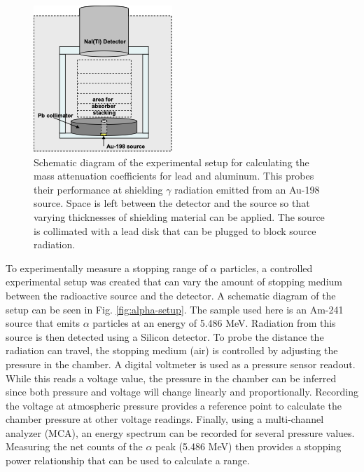 \begin{figure}
\centering
\includegraphics[scale=0.5]{gamma_setup.png}
\caption{Schematic diagram of the experimental setup for calculating the mass attenuation coefficients for lead and aluminum. This probes their performance at shielding $\gamma$ radiation emitted from an Au-198 source. Space is left between the detector and the source so that varying thicknesses of shielding material can be applied. The source is collimated with a lead disk that can be plugged to block source radiation.}
\label{fig:gamma-setup}
\end{figure}

To experimentally measure a stopping range of $\alpha$ particles, a controlled experimental setup was created that can vary the amount of stopping medium between the radioactive source and the detector. A schematic diagram of the setup can be seen in Fig. \ref{fig:alpha-setup}. The sample used here is an Am-241 source that emits $\alpha$ particles at an energy of 5.486 MeV. Radiation from this source is then detected using a Silicon detector. To probe the distance the radiation can travel, the stopping medium (air) is controlled by adjusting the pressure in the chamber. A digital voltmeter is used as a pressure sensor readout. While this reads a voltage value, the pressure in the chamber can be inferred since both pressure and voltage will change linearly and proportionally. Recording the voltage at atmospheric pressure provides a reference point to calculate the chamber pressure at other voltage readings. Finally, using a multi-channel analyzer (MCA), an energy spectrum can be recorded for several pressure values. Measuring the net counts of the $\alpha$ peak (5.486 MeV) then provides a stopping power relationship that can be used to calculate a range.

